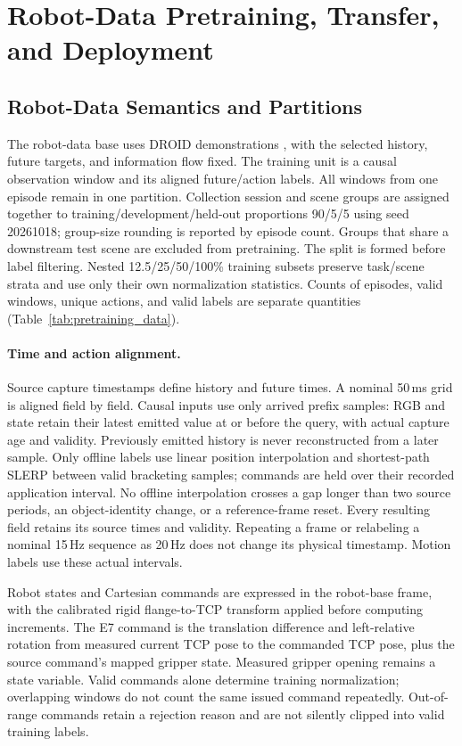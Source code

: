 \section{Robot-Data Pretraining, Transfer, and Deployment}
\label{app:systems}

\subsection{Robot-Data Semantics and Partitions}
The robot-data base uses DROID demonstrations \cite{droid}, with the selected
history, future targets, and information flow fixed. The training unit is a
causal observation window and its aligned future/action labels. All windows
from one episode remain in one partition. Collection session and scene
groups are assigned together to training/development/held-out proportions
90/5/5 using seed 20261018; group-size rounding is reported by episode count.
Groups that share a downstream test scene are excluded from pretraining.
The split is formed before label filtering. Nested 12.5/25/50/100\% training
subsets preserve task/scene strata and use only their own normalization
statistics. Counts of episodes, valid windows, unique actions, and valid
labels are separate quantities (Table~\ref{tab:pretraining_data}).

\paragraph{Time and action alignment.}
Source capture timestamps define history and future times. A nominal
50\,ms grid is aligned field by field. Causal inputs use only arrived
prefix samples: RGB and state retain their latest emitted value at or
before the query, with actual capture age and validity. Previously emitted
history is never reconstructed from a later sample. Only offline labels
use linear position interpolation and shortest-path SLERP between valid
bracketing samples; commands are held over their recorded application
interval. No offline interpolation crosses a gap longer than two
source periods, an object-identity change, or a reference-frame reset.
Every resulting field retains its source times and validity. Repeating
a frame or relabeling a nominal 15\,Hz sequence as 20\,Hz does not change
its physical timestamp. Motion labels use these actual intervals.

Robot states and Cartesian commands are expressed in the robot-base frame,
with the calibrated rigid flange-to-TCP transform applied before computing
increments. The E7 command is the translation difference and left-relative
rotation from measured current TCP pose to the commanded TCP pose, plus
the source command's mapped gripper state. Measured gripper opening remains
a state variable. Valid commands alone determine training normalization;
overlapping windows do not count the same issued command repeatedly.
Out-of-range commands retain a rejection reason and are not silently
clipped into valid training labels.

